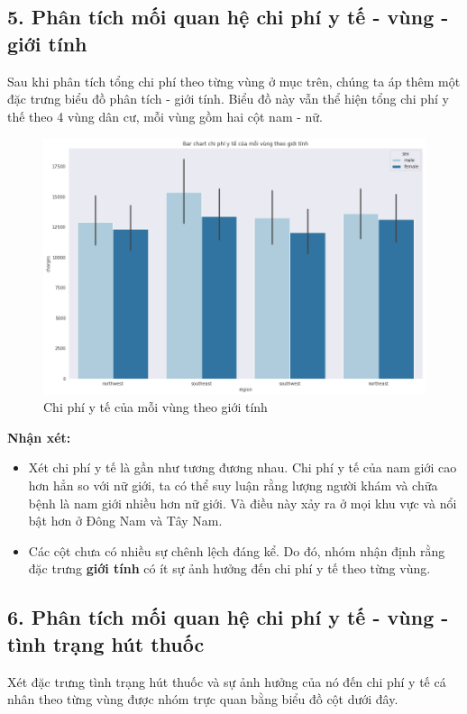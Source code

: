 \documentclass{article}
\begin{document}
	\subsection{5. Phân tích mối quan hệ chi phí y tế - vùng - giới tính}
	Sau khi phân tích tổng chi phí theo từng vùng ở mục trên, chúng ta áp thêm một đặc trưng biểu đồ phân tích - giới tính. Biểu đồ này vẫn thể hiện tổng chi phí y thế theo 4 vùng dân cư, mỗi vùng gồm hai cột nam - nữ.
	
	\begin{figure}[H]
		\centering
		\includegraphics[width=1\textwidth]{images/bar_chart_medical_charges_region_sex.png}
		\caption{Chi phí y tế của mỗi vùng theo giới tính}
		\label{fig:writing-thesis-bar-chart-medical-charges-region-sex}
	\end{figure}
	\textbf{Nhận xét:} 
	\begin{itemize}
		\item Xét chi phí y tế là gần như tương đương nhau. Chi phí y tế của nam giới cao hơn hẳn so với nữ giới, ta có thể suy luận rằng lượng người khám và chữa bệnh là nam giới nhiều hơn nữ giới. Và điều này xảy ra ở mọi khu vực và nổi bật hơn ở Đông Nam và Tây Nam.
		\item Các cột chưa có nhiều sự chênh lệch đáng kể. Do đó, nhóm nhận định rằng đặc trưng \textbf{giới tính} có ít sự ảnh hưởng đến chi phí y tế theo từng vùng.
	\end{itemize}
	
	\subsection{6. Phân tích mối quan hệ chi phí y tế - vùng - tình trạng hút thuốc}
	\qquad Xét đặc trưng tình trạng hút thuốc và sự ảnh hưởng của nó đến chi phí y tế cá nhân theo từng vùng được nhóm trực quan bằng biểu đồ cột dưới đây.
	
\end{document}
